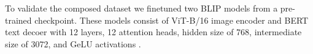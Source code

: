 To validate the composed dataset we finetuned two BLIP models from a pre-trained checkpoint. These models consist of ViT-B/16 image encoder and BERT text decoer with 12 layers, 12 attention heads, hidden size of 768, intermediate size of 3072, and GeLU activations \cite{gelu}.
